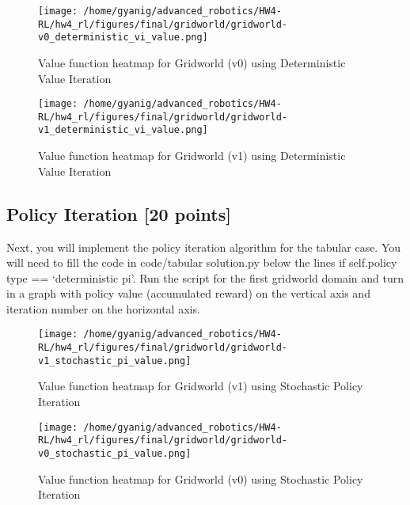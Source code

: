 \documentclass{article}
\newcommand{\points}[1]{{\textbf{[#1 points]}}}
\begin{document}
\begin{figure}[H]
    \centering
    \begin{minipage}[t]{0.45\textwidth}
        \centering
        \texttt{[image: /home/gyanig/advanced\_robotics/HW4-RL/hw4\_rl/figures/final/gridworld/gridworld-v0\_deterministic\_vi\_value.png]}
        \caption{Value function heatmap for Gridworld (v0) using Deterministic Value Iteration}
        \label{fig:gridworld_v0_det_vi}
    \end{minipage}
    \hfill
    \begin{minipage}[t]{0.45\textwidth}
        \centering
        \texttt{[image: /home/gyanig/advanced\_robotics/HW4-RL/hw4\_rl/figures/final/gridworld/gridworld-v1\_deterministic\_vi\_value.png]}
        \caption{Value function heatmap for Gridworld (v1) using Deterministic Value Iteration}
        \label{fig:gridworld_v1_det_vi}
    \end{minipage}
\end{figure}

\subsection{Policy Iteration \points{20}}

Next, you will implement the policy iteration algorithm for the tabular case. You will need
to fill the code in code/tabular solution.py below the lines if self.policy type ==
‘deterministic pi’. Run the script for the first gridworld domain and turn in a graph
with policy value (accumulated reward) on the vertical axis and iteration number on the
horizontal axis.

\begin{figure}[H]
    \centering
    \begin{minipage}[t]{0.45\textwidth}
        \centering
        \texttt{[image: /home/gyanig/advanced\_robotics/HW4-RL/hw4\_rl/figures/final/gridworld/gridworld-v1\_stochastic\_pi\_value.png]}
        \caption{Value function heatmap for Gridworld (v1) using Stochastic Policy Iteration}
        \label{fig:gridworld_v1_stoch_pi}
    \end{minipage}
    \hfill
    \begin{minipage}[t]{0.45\textwidth}
        \centering
        \texttt{[image: /home/gyanig/advanced\_robotics/HW4-RL/hw4\_rl/figures/final/gridworld/gridworld-v0\_stochastic\_pi\_value.png]}
        \caption{Value function heatmap for Gridworld (v0) using Stochastic Policy Iteration}
        \label{fig:gridworld_v0_stoch_pi}
    \end{minipage}
\end{figure}
\end{document}

